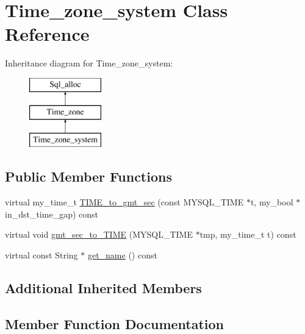 \hypertarget{classTime__zone__system}{}\section{Time\+\_\+zone\+\_\+system Class Reference}
\label{classTime__zone__system}
Inheritance diagram for Time\+\_\+zone\+\_\+system\+:\begin{figure}[H]
\begin{center}
\leavevmode
\includegraphics[height=3.000000cm]{classTime__zone__system}
\end{center}
\end{figure}
\subsection*{Public Member Functions}
\begin{DoxyCompactItemize}
\item 
virtual my\+\_\+time\+\_\+t \mbox{\hyperlink{classTime__zone__system_ad2a1613d3f1e95410c1191a61fe26749}{T\+I\+M\+E\+\_\+to\+\_\+gmt\+\_\+sec}} (const M\+Y\+S\+Q\+L\+\_\+\+T\+I\+ME $\ast$t, my\+\_\+bool $\ast$in\+\_\+dst\+\_\+time\+\_\+gap) const
\item 
virtual void \mbox{\hyperlink{classTime__zone__system_ad32a4573aac61a30383f49d69a93bf68}{gmt\+\_\+sec\+\_\+to\+\_\+\+T\+I\+ME}} (M\+Y\+S\+Q\+L\+\_\+\+T\+I\+ME $\ast$tmp, my\+\_\+time\+\_\+t t) const
\item 
virtual const String $\ast$ \mbox{\hyperlink{classTime__zone__system_a8bca725b2252584788aedf52366acdaf}{get\+\_\+name}} () const
\end{DoxyCompactItemize}
\subsection*{Additional Inherited Members}


\subsection{Member Function Documentation}
\mbox{\label{classTime__zone__system_a8bca725b2252584788aedf52366acdaf}} 
